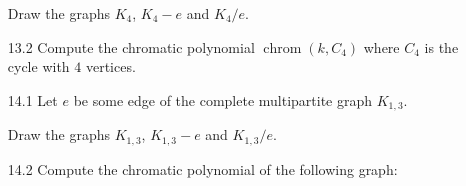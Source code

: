 \documentclass[12pt]{article}
\DeclareMathOperator{\chrom}{chrom}
\begin{document}
\begin{enumerate}
    Draw the graphs $K_4$, $K_4 - e$ and $K_4/e$.
    \item[13.2] Compute the chromatic polynomial $\chrom(k, C_4)$ where $C_4$ is the cycle with $4$ vertices.

        \item[14.1] Let $e$ be some edge of the complete multipartite graph $K_{1,3}$. 
    
    Draw the graphs $K_{1,3}$, $K_{1,3} - e$ and $K_{1,3}/e$.
    \item[14.2] Compute the chromatic polynomial of the following graph:
    



\end{enumerate}
\end{document}
